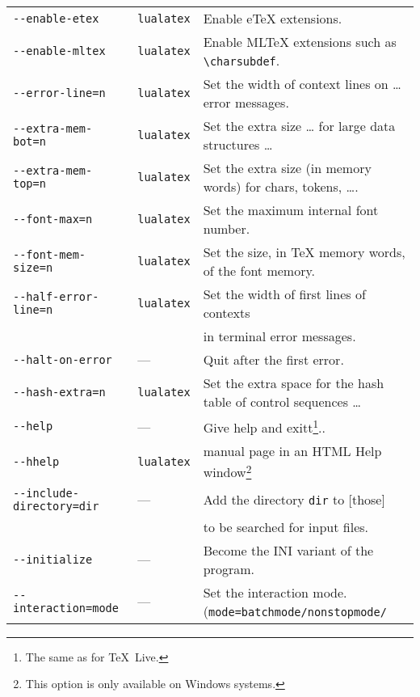 \documentclass{article}
\newcommand{\lualatex}{\texttt{lualatex}}
\newcommand{\texlive}{\TeX~Live}
\begin{document}
{\begin{longtable}{|lll|}
\texttt{-{}-enable-etex}             & \lualatex{} & Enable eTeX extensions. \\
\texttt{-{}-enable-mltex}            & \lualatex{} & Enable MLTeX extensions such as \texttt{\textbackslash{}charsubdef}. \\
\texttt{-{}-error-line=n}            & \lualatex{} & Set the width of context lines on \dots error messages. \\
\texttt{-{}-extra-mem-bot=n}         & \lualatex{} & Set the extra size \dots{} for large data structures \dots \\
\texttt{-{}-extra-mem-top=n}         & \lualatex{} & Set the extra size (in memory words) for chars, tokens, \dots. \\
\texttt{-{}-font-max=n}              & \lualatex{} & Set the maximum internal font number. \\
\texttt{-{}-font-mem-size=n}         & \lualatex{} & Set the size, in TeX memory words, of the font memory. \\
\texttt{-{}-half-error-line=n}       & \lualatex{} & Set the width of first lines of contexts \\
                                     &             & in terminal error messages. \\
\texttt{-{}-halt-on-error}           & ---         & Quit after the first error. \\
\texttt{-{}-hash-extra=n}            & \lualatex{} & Set the extra space for the hash table of control sequences \dots \\
\texttt{-{}-help}                    & ---         & Give help and exitt\footnote%
{The same as for \texlive. }.. \\
\texttt{-{}-hhelp}                   & \lualatex{} & manual page in an HTML Help window\footnote%
{This option is only available on Windows systems.} \\
\texttt{-{}-include-directory=dir}   & ---         & Add the directory \texttt{dir} to [those] \\
                                     &             & to be searched for input files. \\
\texttt{-{}-initialize}              & ---         & Become the INI variant of the program. \\
\texttt{-{}-interaction=mode}        & ---         & Set the interaction mode. (\texttt{mode=batchmode/nonstopmode/}\\

\end{longtable}}
\end{document}
